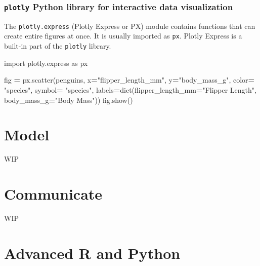 \documentclass[]{book}
\newenvironment{Shaded}{\begin{snugshade}}{\end{snugshade}}
\newcommand{\BuiltInTok}[1]{#1}
\newcommand{\ImportTok}[1]{#1}
\newcommand{\NormalTok}[1]{#1}
\newcommand{\OperatorTok}[1]{\textcolor[rgb]{0.81,0.36,0.00}{\textbf{#1}}}
\newcommand{\StringTok}[1]{\textcolor[rgb]{0.31,0.60,0.02}{#1}}
\begin{document}
\hypertarget{plotly-python-library-for-interactive-data-visualization}{%
\subsection{\texorpdfstring{\texttt{plotly} Python library for interactive data visualization}{plotly Python library for interactive data visualization}}\label{plotly-python-library-for-interactive-data-visualization}}

The \texttt{plotly.express} (Plotly Express or PX) module contains functions that can create entire figures at once. It is usually imported as \texttt{px}. Plotly Express is a built-in part of the \texttt{plotly} library.

\begin{Shaded}
\begin{Highlighting}[]
\ImportTok{import}\NormalTok{ plotly.express }\ImportTok{as}\NormalTok{ px}

\NormalTok{fig }\OperatorTok{=}\NormalTok{ px.scatter(penguins,}
\NormalTok{                 x}\OperatorTok{=}\StringTok{"flipper_length_mm"}\NormalTok{,}
\NormalTok{                 y}\OperatorTok{=}\StringTok{"body_mass_g"}\NormalTok{,}
\NormalTok{                 color}\OperatorTok{=} \StringTok{"species"}\NormalTok{,}
\NormalTok{                 symbol}\OperatorTok{=} \StringTok{"species"}\NormalTok{,}
\NormalTok{                 labels}\OperatorTok{=}\BuiltInTok{dict}\NormalTok{(flipper_length_mm}\OperatorTok{=}\StringTok{"Flipper Length"}\NormalTok{,}
\NormalTok{                             body_mass_g}\OperatorTok{=}\StringTok{"Body Mass"}\NormalTok{))}
\NormalTok{fig.show()}
\end{Highlighting}
\end{Shaded}

\hypertarget{model}{%
\chapter{Model}\label{model}}

WIP

\hypertarget{communicate}{%
\chapter{Communicate}\label{communicate}}

WIP

\hypertarget{advanced-r-and-python}{%
\chapter{Advanced R and Python}\label{advanced-r-and-python}}
\end{document}
